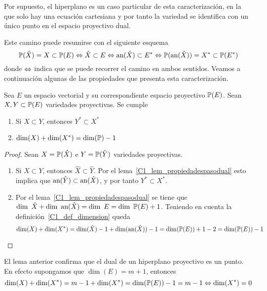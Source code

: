 Por supuesto, el hiperplano es un caso particular de esta caracterización, en la que solo hay una ecuación cartesiana y por tanto la variedad se identifica con un único punto en el espacio proyectivo dual.

Este camino puede resumirse con el siguiente esquema
\begin{equation}
	\mathbb{P}(\hat{X})=X\subset\mathbb{P}(E)\Leftrightarrow \hat{X}\subset E\Leftrightarrow \text{an}(\hat{X})\subset E^*\Leftrightarrow \mathbb{P}(\text{an}(\hat{X}))=X^*\subset \mathbb{P}(E^*)
\end{equation}
donde $\Leftrightarrow$ indica que se puede recorrer el camino en ambos sentidos.
Veamos a continuación algunas de las propiedades que presenta esta caracterización.
\begin{lem}
	\label{C1_lem_propiedadesPasoProyectivoDual}
	Sea $E$ un espacio vectorial y su correspondiente espacio proyectivo $\mathbb{P}(E)$. Sean $X,Y\subset\mathbb{P}(E)$ variedades proyectivas. Se cumple
	\begin{enumerate}
		\item Si $X\subset Y$, entonces $Y^*\subset X^*$
		\item $\dim(X)+\dim(X^*)=\dim(\mathbb{P})-1$
	\end{enumerate}
\end{lem}
\begin{proof}
	Sean $X=\mathbb{P}(\hat{X})$ e $Y=\mathbb{P}(\hat{Y})$ variedades proyectivas.
	\begin{enumerate}
		\item Si $X\subset Y$, entonces $\hat{X}\subset\hat{Y}$. Por el lema~\ref{C1_lem_propiedadespasodual} esto implica que $\text{an}(\hat{Y})\subset \text{an}(\hat{X})$, y por tanto $Y^*\subset X^*$.
		
		\item Por el lema~\ref{C1_lem_propiedadespasodual} se tiene que $\dim \ \hat{X}+\dim \ \an{\hat{X}}=\dim \ E=\dim \ \proy(E)+1$. Teniendo en cuenta la definición~\ref{C1_def_dimension} queda
		\begin{equation*}
			\dim(X)+\dim(X^*)=\dim(\hat{X})-1+\dim(\text{an}(\hat{X}))-1=\dim(\mathbb{P}(E))+1-2=\dim(\mathbb{P}(E))-1
		\end{equation*}
	\end{enumerate}
\end{proof}
\begin{obs}
	El lema anterior confirma que el dual de un hiperplano proyectivo es un punto. En efecto supongamos que $\dim(E)=m+1$, entonces
	\begin{equation*}
		\dim(X)+\dim(X^*)=m-1+\dim(X^*)=\dim(\mathbb{P}(E))-1=m-1\Leftrightarrow \dim(X^*)=0
	\end{equation*}
\end{obs}
